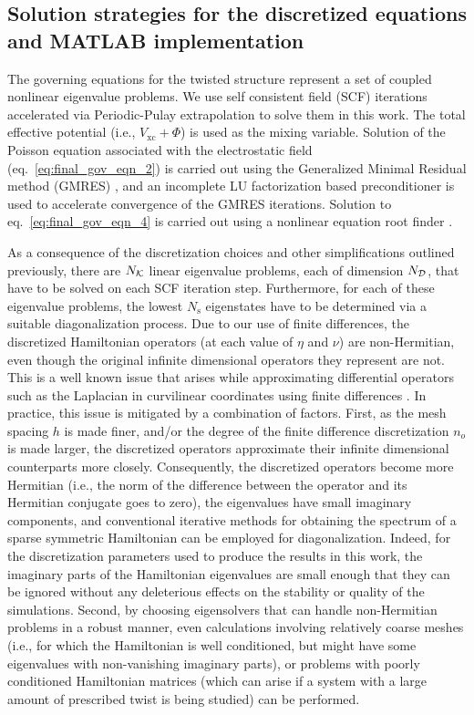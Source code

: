 \documentclass[preprint,12pt, 3p, sort&compress]{elsarticle}
\begin{document}
\subsection{Solution strategies for the discretized equations and MATLAB implementation}
\label{subsec:discretized_solution_and_Matlab}
The governing equations for the twisted structure represent a set of coupled nonlinear eigenvalue problems. We use self consistent field (SCF) iterations accelerated via Periodic-Pulay extrapolation \citep{banerjee2016periodic} to solve them in this work. The total effective potential (i.e., $V_{\text{xc}} + \Phi$) is used as the mixing variable. Solution of the Poisson equation associated with the electrostatic field (eq.~\ref{eq:final_gov_eqn_2}) is carried out using the Generalized Minimal Residual method (GMRES) \citep{saad1986gmres}, and an incomplete LU factorization based preconditioner \citep{saad2003iterative} is used to accelerate convergence {of the GMRES iterations}. Solution to eq.~\ref{eq:final_gov_eqn_4} is carried out using a nonlinear equation root finder \citep{forsythe1977computer}.


As a consequence of the discretization choices and other simplifications outlined previously, there are $N_{{\cal K}}$ linear eigenvalue problems, each of dimension $N_{{\cal D}}$, that have to be solved on each SCF iteration step. Furthermore, for each of these eigenvalue problems, the lowest $N_{\text{s}}$ eigenstates have to be determined via a suitable diagonalization process. Due to our use of finite differences, the discretized Hamiltonian operators (at each value of $\eta$ and $\nu$) are non-Hermitian, even though the original infinite dimensional operators they represent are not. This is a well known issue that arises while approximating differential operators such as the Laplacian in curvilinear coordinates using finite differences \citep{gygi1995real, banerjee2016cyclic, ghosh2019symmetry}. In practice, this issue is mitigated by a combination of factors. First, as the mesh spacing $h$ is made finer, and/or the degree of the finite difference discretization $n_o$ is made larger, the discretized operators approximate their infinite dimensional counterparts more closely. Consequently, the discretized operators become more Hermitian (i.e., the norm of the difference between the operator and its Hermitian conjugate goes to zero), the eigenvalues have small imaginary components, and conventional iterative methods for obtaining the spectrum of a sparse symmetric Hamiltonian \citep{zhou2014chebyshev, saad1996solution, saad2010numerical} can be employed for diagonalization. Indeed, for the discretization parameters used to produce the results in this work, the imaginary parts of the Hamiltonian eigenvalues are small enough that they can be  ignored without any deleterious effects on the stability or quality of the simulations. Second, by choosing eigensolvers that can handle non-Hermitian problems in a robust manner, even calculations involving relatively coarse meshes (i.e., for which the Hamiltonian is well conditioned, but might have some eigenvalues with non-vanishing imaginary parts), or problems with poorly conditioned Hamiltonian matrices (which can arise if a system with a large amount of prescribed twist is being studied) can be performed.
\end{document}
